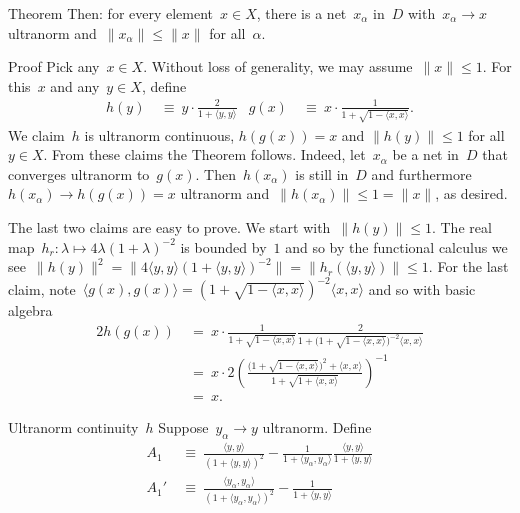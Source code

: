 \documentclass[b]{subfiles}
\begin{document}
\begin{parsec}
\begin{point}{Theorem}
Then: for every element~$x \in X$,
    there is a net~$x_\alpha$ in~$D$
    with~$x_\alpha \to x$ ultranorm
    and~$\|x_\alpha\| \leq \|x\|$ for all~$\alpha$.
\begin{point}{Proof}%
Pick any~$x \in X$.
Without loss of generality, we may assume~$\| x \| \leq 1$.
For this~$x$ and any~$y \in X$, define
\begin{align*}
    h(y) &\ \equiv \ y \cdot\frac{2}{1+ \langle y, y \rangle}
    &
    g(x) &\ \equiv \ x \cdot\frac{1}{1+ \sqrt{1- \langle x, x\rangle}}.
\end{align*}
We claim~$h$ is ultranorm continuous,
$h(g(x)) = x$ and $\| h(y) \| \leq 1$ for all~$y \in X$.
From these claims the Theorem follows.
Indeed, let~$x_\alpha$ be a net in~$D$
    that converges ultranorm to~$g(x)$.
Then~$h(x_\alpha)$ is
    still in~$D$
    and furthermore~$h(x_\alpha) \to h(g(x)) = x$ ultranorm
    and~$\| h(x_\alpha) \| \leq 1 = \| x \|$, as desired.
\begin{point}%
The last two claims are easy to prove.
We start with~$\| h(y) \| \leq 1$.
The real map~$h_r\colon \lambda \mapsto 4 \lambda (1+\lambda)^{-2}$
    is bounded by~$1$ and so by the functional calculus
    we see~$\| h(y) \|^2 = \| 4 \langle y,y\rangle (1+ \langle y,y\rangle)^{-2} \|
                = \| h_r(\langle y,y\rangle) \|  \leq 1$.
For the last claim, note~$\langle g(x), g(x) \rangle
= (1 + \sqrt{1 - \langle x,x \rangle })^{-2} \langle x,x\rangle$
and so with basic algebra
\begin{alignat*}{2}
    h(g(x)) &\ = \ x \cdot
\frac{1}{ 1 + \sqrt{1 - \langle x,x\rangle }}
\frac{2}{1 + \bigl(1 + \sqrt{1 - \langle x,x \rangle }\bigr)^{-2} \langle x,x\rangle} \\
& \ =\  x \cdot 2 \left( \frac{
    \bigl(1 + \sqrt{1-\langle x, x\rangle}\bigr)^2 + \langle x,x \rangle
}{1 + \sqrt{1 + \langle x,x \rangle}} \right)^{-1} \\
& \ = \ x.
\end{alignat*}
\end{point}
\begin{point}{Ultranorm continuity~$h$}%
Suppose~$y_\alpha \to y$ ultranorm. Define
\begin{align*}
    A_1 & \ \equiv \ \frac{\langle y,y\rangle}{(1 + \langle y,y \rangle)^2} 
            - \frac{1}{1+\langle y_\alpha,y_\alpha \rangle} \frac{\langle y,y \rangle}{1+\langle y,y \rangle} \\
    A_1' & \ \equiv \ 
    \frac{\langle y_\alpha,y_\alpha\rangle}{(1 + \langle y_\alpha,y_\alpha \rangle)^2}  
    - \frac{1}{1+\langle y,y \rangle}

\end{align*}
\end{point}
\end{point}
\end{point}
\end{parsec}
\end{document}
